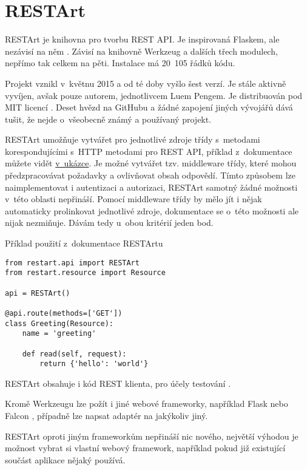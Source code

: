 \section{RESTArt}\label{restart}

RESTArt je knihovna pro tvorbu REST API. Je inspirovaná Flaskem, ale nezávisí na něm \autocite{restartgh}. Závisí na knihovně Werkzeug a dalších třech modulech, nepřímo tak celkem na pěti. Instalace má 20~105 řádků kódu.

Projekt vznikl v~květnu 2015 a od té doby vyšlo šest verzí. Je stále aktivně vyvíjen, avšak pouze autorem, jednotlivcem Luem Pengem. Je distribuován pod MIT licencí \autocite{MIT}. Deset hvězd na GitHubu a žádné zapojení jiných vývojářů dává tušit, že nejde o~všeobecně známý a používaný projekt.

RESTArt umožňuje vytvářet pro jednotlivé zdroje třídy s~metodami korespondujícími s~HTTP metodami pro REST API, příklad z~dokumentace můžete vidět \protect\hyperlink{code:restart}{v~ukázce}. Je možné vytvářet tzv. middleware třídy, které mohou předzpracovávat požadavky a ovlivňovat obsah odpovědí. Tímto způsobem lze naimplementovat i autentizaci a autorizaci, RESTArt samotný žádné možnosti v~této oblasti nepřináší. Pomocí middleware třídy by mělo jít i nějak automaticky prolinkovat jednotlivé zdroje, dokumentace se o~této možnosti ale nijak nezmiňuje. Dávám tedy u~obou kritérií jeden bod.

\begin{listing}[htbp]
\caption{{\label{code:restart}Příklad použití z~dokumentace RESTArtu \autocite{restartqs}}}
\begin{verbatim}
from restart.api import RESTArt
from restart.resource import Resource

api = RESTArt()

@api.route(methods=['GET'])
class Greeting(Resource):
    name = 'greeting'

    def read(self, request):
        return {'hello': 'world'}
\end{verbatim}
\end{listing}

RESTArt obsahuje i kód REST klienta, pro účely testování \autocite{restartt}.

Kromě Werkzeugu lze požít i jiné webové frameworky, například Flask nebo Falcon \autocite{restartframeworks}, případně lze napsat adaptér na jakýkoliv jiný.

RESTArt oproti jiným frameworkům nepřináší nic nového, největší výhodou je možnost vybrat si vlastní webový framework, například pokud již existující součást aplikace nějaký používá.

